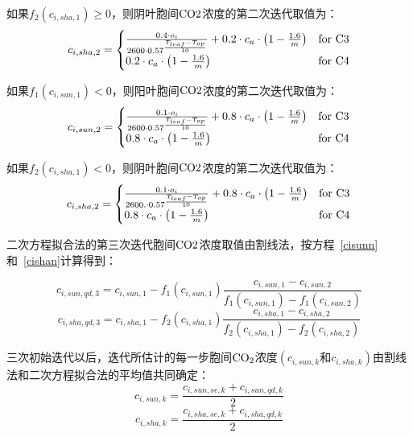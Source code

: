 如果$f_{2}\left(c_{i,sha,1}\right)\geqslant0$，则阴叶胞间$\rm CO2$浓度的第二次迭代取值为：
\begin{align}\label{cisha_2_fp}
c_{i,sha,2}=
\begin{cases}
\frac{0.4 \cdot o_{i}} {2600 \cdot 0.57 ^\frac{T_{{leaf }} -  T_{o p}}{10}} + 0.2\cdot c_{a}\cdot\left(1-\frac{1.6}{m}\right)  &\rm for\,\, C3\\
0.2\cdot c_{a}\cdot\left(1-\frac{1.6}{m}\right) &\rm for\,\, C4
\end{cases}
\end{align}

如果$f_{1}\left(c_{i,sun,1}\right)<0$，则阳叶胞间$\rm CO2$浓度的第二次迭代取值为：
\begin{align}\label{cisun_2_fn}
c_{i,sun,2}=
\begin{cases}
\frac{0.1 \cdot o_{i}} {2600 \cdot 0.57 ^\frac{T_{{leaf }} -  T_{o p}}{10}} + 0.8\cdot c_{a}\cdot\left(1-\frac{1.6}{m}\right)  &\rm for\,\, C3\\
0.8\cdot c_{a}\cdot\left(1-\frac{1.6}{m}\right) &\rm for\,\, C4
\end{cases}
\end{align}

如果$f_{2}\left(c_{i,sha,1}\right)<0$，则阴叶胞间$\rm CO2$浓度的第二次迭代取值为：
\begin{align}\label{cisha_2_fn}
c_{i,sha,2}=
\begin{cases}
\frac{0.1 \cdot o_{i}} {2600. \cdot 0.57 ^\frac{T_{{leaf }} -  T_{o p}}{10}} + 0.8\cdot c_{a}\cdot\left(1-\frac{1.6}{m}\right)  &\rm for\,\, C3\\
0.8\cdot c_{a}\cdot\left(1-\frac{1.6}{m}\right) &\rm for\,\, C4
\end{cases}
\end{align}

二次方程拟合法的第三次迭代胞间$\rm CO2$浓度取值由割线法，按方程~\eqref{cisunn} 和~\eqref{cishan}计算得到：

\begin{equation}\label{cisun3}
c_{i,sun,qd,3}=c_{i,sun,1}-f_{1}\left(c_{i,sun,1}\right)\frac{c_{i,sun,1}-c_{i,sun,2}}{ f_{1}\left(c_{i,sun,1}\right)-f_{1}\left(c_{i,sun,2}\right)} 
\end{equation}
\begin{equation}\label{cisha3}
c_{i,sha,qd,3}=c_{i,sha,1}-f_{2}\left(c_{i,sha,1}\right)\frac{c_{i,sha,1}-c_{i,sha,2}}{ f_{2}\left(c_{i,sha,1}\right)-f_{2}\left(c_{i,sha,2}\right)} 
\end{equation}

三次初始迭代以后，迭代所估计的每一步胞间$\rm CO_2$浓度$\left(c_{i,sun,k}和c_{i,sha,k}\right)$由割线法和二次方程拟合法的平均值共同确定：
\begin{equation}
c_{i,sun,k}=\frac{c_{i,sun,se,k}+c_{i,sun,qd,k}}{2}
\end{equation}
\begin{equation}
c_{i,sha,k}=\frac{c_{i,sha,se,k}+c_{i,sha,qd,k}}{2}
\end{equation}


